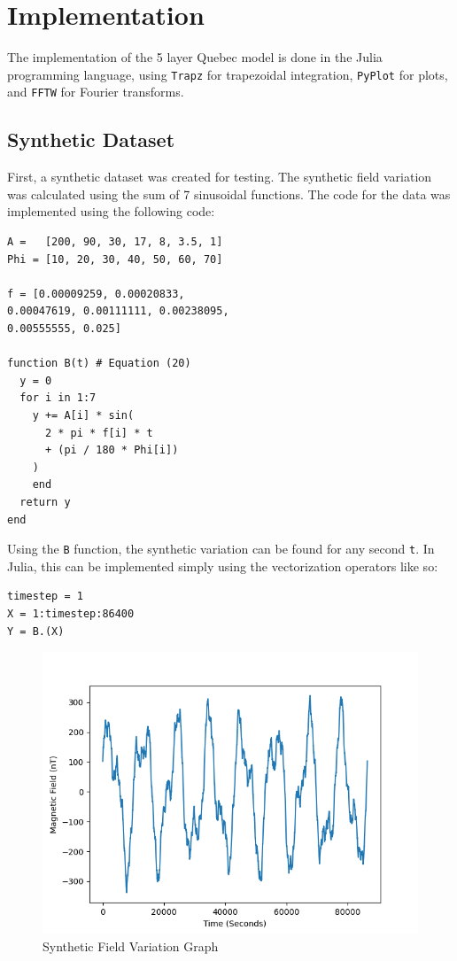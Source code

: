 \documentclass[letterpaper, 12 pt, conference]{ieeeconf}  %
\begin{document}
\section{Implementation}
The implementation of the 5 layer Quebec model is done in the Julia programming language, using \verb|Trapz| for trapezoidal integration, \verb|PyPlot| for plots, and \verb|FFTW| for Fourier transforms.

\subsection{Synthetic Dataset}
First, a synthetic dataset was created for testing. The synthetic field variation was calculated using the sum of 7 sinusoidal functions. The code for the data was implemented using the following code:
\begin{lstlisting}
A =   [200, 90, 30, 17, 8, 3.5, 1]
Phi = [10, 20, 30, 40, 50, 60, 70]

f = [0.00009259, 0.00020833, 
0.00047619, 0.00111111, 0.00238095, 
0.00555555, 0.025]

function B(t) # Equation (20)
  y = 0
  for i in 1:7
    y += A[i] * sin(
      2 * pi * f[i] * t 
	  + (pi / 180 * Phi[i])
	)
	end
  return y
end
\end{lstlisting}

Using the \verb|B| function, the synthetic variation can be found for any second \verb|t|. In Julia, this can be implemented simply using the vectorization operators like so:

\begin{lstlisting}
timestep = 1
X = 1:timestep:86400
Y = B.(X)
\end{lstlisting}

\begin{figure}
    \centering
    \includegraphics[width=\columnwidth]{Figure_1.png}
    \caption{Synthetic Field Variation Graph}
    \label{fig:my_label}
\end{figure}
\end{document}
